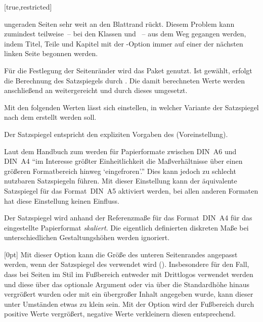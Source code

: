 \begin{Declaration*}{}
\begin{Declaration*}{}
\begin{Declaration*}{}
\begin{Declaration}[%
  v2.03;
  v2.05!\Option{cdgeometry=restricted};%
  v2.05!\Option{cdgeometry=adapted};%
  v2.05!\Option{cdgeometry=calculated};%
]{}[true,restricted]
\begin{values}{}
{    ungeraden Seiten sehr weit an den Blattrand rückt.
  }
  Diesem Problem kann zumindest teilweise~-- bei den Klassen  
  und ~-- aus dem Weg gegangen werden, indem Titel, Teile 
  und Kapitel mit der \KOMAScript-Option  immer auf einer 
  der nächsten linken Seite begonnen werden.
\end{values}
%
Für die Festlegung der Seitenränder wird das Paket  genutzt. 
Ist  gewählt, erfolgt die Berechnung des Satzspiegels 
durch . Die damit berechneten Werte werden anschließend an 
 weitergereicht und durch dieses umgesetzt.

Mit den folgenden Werten lässt sich einstellen, in welcher Variante der 
Satzspiegel nach dem \TUDCD erstellt werden soll. 
%
\begin{values}{}
\item[restricted]
  Der Satzspiegel entspricht den expliziten Vorgaben des \CDs (Voreinstellung).
\item[adapted]
  Laut dem Handbuch zum \CD werden für Papierformate zwischen DIN~A6 und DIN~A4 
  \enquote{im Interesse größter Einheitlichkeit die Maßverhältnisse über einen 
  größeren Formatbereich hinweg \enquote{eingefroren}.} Dies kann jedoch zu 
  schlecht nutzbaren Satzspiegeln führen. Mit dieser Einstellung kann der 
  äquivalente Satzspiegel für das Format~DIN~A5 aktiviert werden, bei allen 
  anderen Formaten hat diese Einstellung keinen Einfluss. 
\item[calculated]
  Der Satzspiegel wird anhand der Referenzmaße für das Format~DIN~A4 für das 
  eingestellte Papierformat \emph{skaliert}. Die eigentlich definierten 
  diskreten Maße bei unterschiedlichen Gestaltungshöhen werden ignoriert.
\end{values}
\end{Declaration}

\begin{Declaration}[v2.03]{}[0pt]%
\printdeclarationlist%
%
Mit dieser Option kann die Größe des unteren Seitenrandes angepasst werden, 
wenn der Satzspiegel des \CDs verwendet wird ().
Insbesondere für den Fall, dass bei Seiten im Stil  
im Fußbereich entweder mit  Drittlogos verwendet werden und 
diese über das optionale Argument oder via  über die 
Standardhöhe hinaus vergrößert wurden oder mit  ein 
übergroßer Inhalt angegeben wurde, kann dieser unter Umständen etwas zu klein 
sein. Mit der Option  wird der Fußbereich durch 
positive Werte vergrößert, negative Werte verkleinern diesen entsprechend. 


\end{Declaration}
\end{Declaration*}
\end{Declaration*}
\end{Declaration*}
